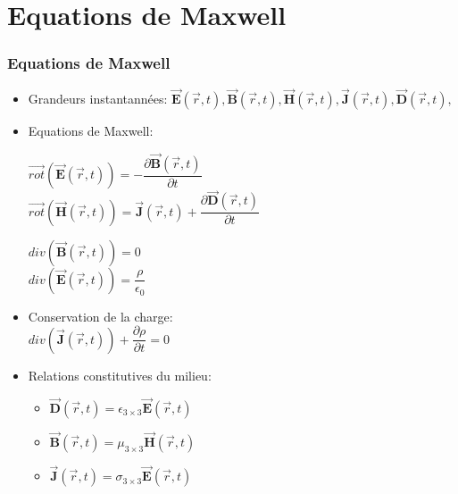 \documentclass[
10pt,
aspectratio=169,
]{beamer}
\begin{document}
\section{Equations de Maxwell}
\begin{frame} 
\frametitle{Equations de Maxwell} 

\begin{itemize}
\item Grandeurs instantannées: \hspace{1cm} $\vec{\bm{E}}(\vec{r},t),\vec{\bm{B}}(\vec{r},t),\vec{\bm{H}}(\vec{r},t),\vec{\bm{J}}(\vec{r},t),\vec{\bm{D}}(\vec{r},t), $

\item Equations de Maxwell: \\ 
\begin{minipage}{0.45\textwidth}
\begin{center} \begin{tcolorbox}[colframe=red,width=6.5cm]
\center$\vec{rot}(\vec{\bm{E}}(\vec{r},t))=-\dfrac{\partial\vec{\bm{B}}(\vec{r},t)}{\partial t}$\\
$\vec{rot}(\vec{\bm{H}}(\vec{r},t))=\vec{\bm{J}}(\vec{r},t)+\dfrac{\partial\vec{\bm{D}}(\vec{r},t)}{\partial t}$
\end{tcolorbox}\end{center}
\end{minipage}
\begin{minipage}{0.45\textwidth}
\begin{center} \begin{tcolorbox}[colframe=red,width=4cm]
\center$div(\vec{\bm{B}}(\vec{r},t))=0$\\
\vspace{0.5cm}
$div(\vec{\bm{E}}(\vec{r},t))=\dfrac{\rho}{\epsilon_0}$
\end{tcolorbox}\end{center}
\end{minipage}
\end{itemize}

\begin{minipage}[t]{0.45\textwidth}
\begin{itemize}

\item Conservation de la charge: \\
$div(\vec{\bm{J}}(\vec{r},t))+\dfrac{\partial\rho}{\partial t}=0$

\item Relations constitutives du milieu: 
\begin{itemize}
\item $\vec{\bm{D}}(\vec{r},t)=\epsilon_{3\times 3}\vec{\bm{E}}(\vec{r},t)$
\item $\vec{\bm{B}}(\vec{r},t)=\mu_{3\times 3}\vec{\bm{H}}(\vec{r},t)$
\item $\vec{\bm{J}}(\vec{r},t)=\sigma_{3\times 3}\vec{\bm{E}}(\vec{r},t)$


\end{itemize}
\end{itemize}
\end{minipage}
\end{frame}
\end{document}
